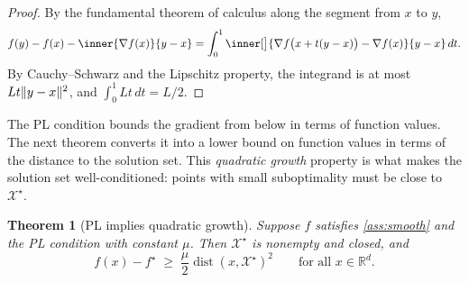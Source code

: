 \documentclass[11pt,a4paper,oneside]{report}
\theoremstyle{plain}
\newtheorem{theorem}{Theorem}[chapter]
\theoremstyle{definition}
\theoremstyle{remark}
\newcommand{\R}{\mathbb{R}}
\newcommand{\X}{\mathcal{X}^\star}
\DeclarePairedDelimiter{\norm}{\lVert}{\rVert}
\DeclareMathOperator{\dist}{dist}
\begin{document}
\begin{proof}
By the fundamental theorem of calculus along the segment from $x$ to $y$,
\[
  f(y) - f(x) - \inner{\nabla f(x)}{y - x} = \int_0^1 \inner[\big]{\nabla f\bigl(x + t(y - x)\bigr) - \nabla f(x)}{y - x}\,dt.
\]
By Cauchy--Schwarz and the Lipschitz property, the integrand is at most $Lt\norm{y - x}^2$, and $\int_0^1 Lt\,dt = L/2$.
\end{proof}

The PL condition bounds the gradient from below in terms of function values. The next theorem converts it into a lower bound on function values in terms of the distance to the solution set. This \emph{quadratic growth} property is what makes the solution set well-conditioned: points with small suboptimality must be close to $\X$.

\begin{theorem}[PL implies quadratic growth]\label{thm:qg}
Suppose $f$ satisfies \cref{ass:smooth} and the PL condition with constant $\mu$. Then $\X$ is nonempty and closed, and
\begin{equation}\label{eq:qg}
  f(x) - f^\star \;\ge\; \frac{\mu}{2}\dist(x, \X)^2 \qquad\text{for all } x\in\R^d.
\end{equation}
\end{theorem}
\end{document}

